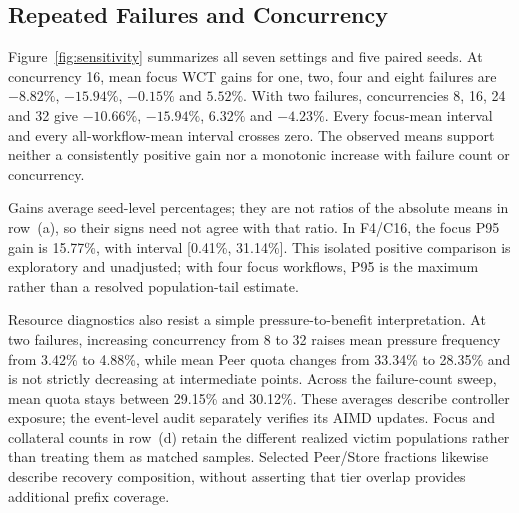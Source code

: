 \subsection{Repeated Failures and Concurrency}
\label{sec:sensitivity-results}


Figure~\ref{fig:sensitivity} summarizes all seven settings and five paired
seeds. At concurrency 16, mean focus WCT gains for one, two, four and eight
failures are $-8.82\%$, $-15.94\%$, $-0.15\%$ and $5.52\%$. With two failures,
concurrencies 8, 16, 24 and 32 give $-10.66\%$, $-15.94\%$, $6.32\%$ and
$-4.23\%$. Every focus-mean interval and every all-workflow-mean interval
crosses zero. The observed means support neither a consistently positive
gain nor a monotonic increase with failure count or concurrency.

Gains average seed-level percentages; they are not ratios of the absolute
means in row~(a), so their signs need not agree with that ratio. In F4/C16,
the focus P95 gain is 15.77\%, with interval [0.41\%, 31.14\%]. This isolated
positive comparison is exploratory and unadjusted; with four focus workflows,
P95 is the maximum rather than a resolved population-tail estimate.

Resource diagnostics also resist a simple pressure-to-benefit interpretation.
At two failures, increasing concurrency from 8 to 32 raises mean pressure
frequency from 3.42\% to 4.88\%, while mean Peer quota changes from 33.34\%
to 28.35\% and is not strictly decreasing at intermediate points. Across
the failure-count sweep, mean quota stays between 29.15\% and 30.12\%.
These averages describe controller exposure; the event-level audit separately
verifies its AIMD updates. Focus and collateral counts in row~(d) retain the
different realized victim populations rather than treating them as matched
samples. Selected Peer/Store fractions likewise describe recovery composition,
without asserting that tier overlap provides additional prefix coverage.
